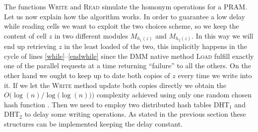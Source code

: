 \begin{algorithm}[H]
  \begin{algorithmic}[1]     
      \State {\Call{LocalRead}{$Y$, $C$} \Comment{Reads up to $C$ elements
          of $Y$ saved on $M_i$} 
      \For {$j \in \left[1,\dots C\right]$}
      \For {$D$ times}
      \State {\Call{Store}{$y_j$, $M_{h(y_j)}$} \Comment{Ordinary DMM
          storing mechanism}
      \EndFor
      \EndFor
      \EndParFor
    \EndProcedure
  \end{algorithmic}
\end{algorithm}


\begin{algorithm}[H]
  \begin{algorithmic}[1]
     
     \EndFor
      \State {\Call{Lookup}{DHT$_j$, $Z$}
      \ParFor {$i \in \left[1,\dots n\right]$}
      \If {$z_i$ found in DHT$_j$} 
        \State {Status$[i]$ = success}
        \EndIf
      \EndParFor
      \EndFor
      \While {$\exists \; k \in [1,\dots n]$ s.t. Status$[k]$ = failure}
      \label{while}
      \For {$j = 1,\; 2$}
      \ParFor {$i \in \left[1,\dots n\right]$}
      \If {Status$[i]$ = failure}
      \State {outc = \Call{Load}{$z_i$, $M_{h_j(z_i)}$}}
      \Comment{DMM loading mechanism}
      \EndIf
      \If {Status$[i]$ = failure \&  outc = success} 
      \State {Status$[i]$ = success} \label{endwhile}
      
      \EndWhile
     \EndProcedure
  \end{algorithmic}
\end{algorithm}

The functions \textsc{Write} and \textsc{Read} simulate the homonym operations
for a PRAM. Let us now explain how the algorithm works. In order to guarantee
a low delay while reading cells we want to exploit the two choices scheme,
so we keep the content of cell $z$ in two different modules $M_{h_1(z)}$ and
$M_{h_2(z)}$. In this way we will end up retrieving $z$ in the least loaded
of the two, this implicitly happens in the cycle of lines
\ref{while}--\ref{endwhile} since
the DMM native method \textsc{Load} fulfill exactly one of the parallel requests at
a time returning ``failure'' to all the others.
On the other hand we ought to keep up to date both copies of $z$
every time we write into it. If we let the \textsc{Write} method update
both copies directly we obtain the $O\bigl(\log(n)\bigr / \log\bigl(\log(n)\bigr)\big)$ complexity achieved using only
one random chosen hash function \cite{art}. Then we need to employ two
distributed hash tables DHT$_1$ and DHT$_2$ to delay some writing operations.
As stated in the previous section these structures can be implemented keeping
the delay constant.









